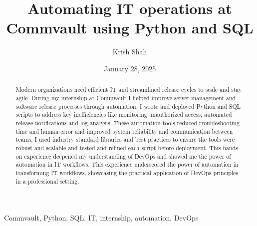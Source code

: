 ﻿\documentclass[12pt,conference,onecolumn]{IEEEtran}
\title{Automating IT operations at Commvault using Python and SQL}
\author{Krish Shah}
\date{January 28, 2025}
\begin{document}
\maketitle 

\begin{abstract}
Modern organizations need efficient IT and streamlined release cycles to scale and stay agile. During my internship at Commvault I helped improve server management and software release processes through automation. I wrote and deployed Python and SQL scripts to address key inefficiencies like monitoring unauthorized access, automated release notifications and log analysis. These automation tools reduced troubleshooting time and human error and improved system reliability and communication between teams. I used industry standard libraries and best practices to ensure the tools were robust and scalable and tested and refined each script before deployment. This hands-on experience deepened my understanding of DevOps and showed me the power of automation in IT workflows. This experience underscored the power of automation in transforming IT workflows, showcasing the practical application of DevOps principles in a professional setting.
\end{abstract}

\begin{IEEEkeywords}
Commvault, Python, SQL, IT, internship, automation, DevOps
\end{IEEEkeywords}
\end{document}
